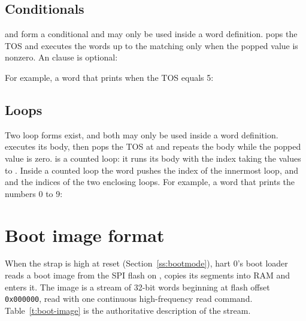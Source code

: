 \documentclass[11pt,pdftex,openany,letterpaper]{report}
\begin{document}
\noindent{}

\section{Conditionals}

 and  form a conditional and may only be used inside a word definition.  pops the TOS and executes the words up to the matching  only when the popped value is nonzero. An  clause is optional:

\noindent{}

\noindent For example, a word that prints  when the TOS equals 5:

\noindent{}

\section{Loops}

Two loop forms exist, and both may only be used inside a word definition.  executes its body, then pops the TOS at  and repeats the body while the popped value is zero.  is a counted loop: it runs its body with the index taking the values  to . Inside a counted loop the word  pushes the index of the innermost loop, and  and  the indices of the two enclosing loops. For example, a word that prints the numbers 0 to 9:

\noindent{}

\clearpage



\chapter{Boot image format} \label{s:programming}

When the  strap is high at reset (Section~\ref{ss:bootmode}), hart 0's boot loader reads a boot image from the SPI flash on , copies its segments into RAM and enters it. The image is a stream of 32-bit words beginning at flash offset \texttt{0x000000}, read with one continuous high-frequency read command. Table~\ref{t:boot-image} is the authoritative description of the stream.
\end{document}
